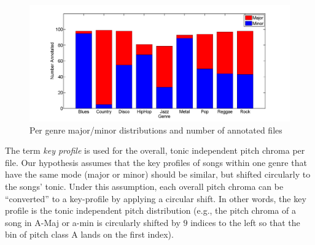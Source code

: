 \documentclass{article}
\begin{document}
\begin{figure}[tb]\label{tab:NumberOfAnnotatedDataSetEntries}
    \includegraphics[scale=.2]{graph/annotated}
	\caption{Per genre major/minor distributions and number of annotated files}
	\label{fig:confPC+MFCC}
\end{figure}


The term \textit{key profile} is used for the overall, tonic independent pitch chroma per file. Our hypothesis assumes that the key profiles of songs within one genre that have the same mode (major or minor) should be similar, but shifted circularly to the songs' tonic. Under this assumption, each overall pitch chroma can be ``converted'' to a key-profile by applying a circular shift. In other words, the key profile is the tonic independent pitch distribution (e.g., the pitch chroma of a song in A-Maj or a-min is circularly shifted by $9$ indices to the left so that the bin of pitch class A lands on the first index).

\end{document}
